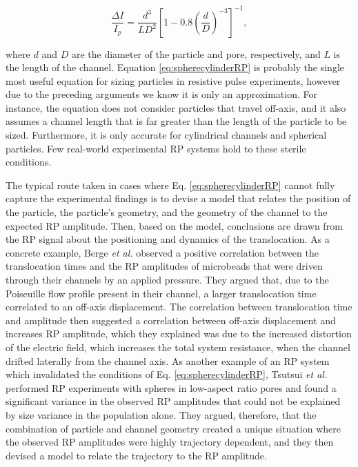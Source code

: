 		\begin{equation}\label{eq:spherecylinderRP}
			\frac{\Delta I}{I_{p}}=\frac{d^{3}}{LD^{2}}\left[1-0.8\left(\frac{d}{D}\right)^{-3}\right]^{-1},
		\end{equation}
		
		where $d$ and $D$ are the diameter of the particle and pore, respectively, and $L$ is the length of the channel. Equation \ref{eq:spherecylinderRP} is probably the single most useful equation for sizing particles in resistive pulse experiments, however due to the preceding arguments we know it is only an approximation. For instance, the equation does not consider particles that travel off-axis, and it also assumes a channel length that is far greater than the length of the particle to be sized. Furthermore, it is only accurate for cylindrical channels and spherical particles. Few real-world experimental RP systems hold to these sterile conditions. 
		
		The typical route taken in cases where Eq. \ref{eq:spherecylinderRP} cannot fully capture the experimental findings is to devise a model that relates the position of the particle, the particle's geometry, and the geometry of the channel to the expected RP amplitude. Then, based on the model, conclusions are drawn from the RP signal about the positioning and dynamics of the translocation. As a concrete example, Berge \emph{et al.} observed a positive correlation between the translocation times and the RP amplitudes of microbeads that were driven through their channels by an applied pressure. They argued that, due to the Poiseuille flow profile present in their channel, a larger translocation time correlated to an off-axis displacement. The correlation between translocation time and amplitude then suggested a correlation between off-axis displacement and increases RP amplitude, which they explained was due to the increased distortion of the electric field, which increases the total system resistance, when the channel drifted laterally from the channel axis. As another example of an RP system which invalidated the conditions of Eq. \ref{eq:spherecylinderRP}, Tsutsui \emph{et al.} performed RP experiments with spheres in low-aspect ratio pores and found a significant variance in the observed RP amplitudes that could not be explained by size variance in the population alone. They argued, therefore, that the combination of particle and channel geometry created a unique situation where the observed RP amplitudes were highly trajectory dependent, and they then devised a model to relate the trajectory to the RP amplitude.
		
